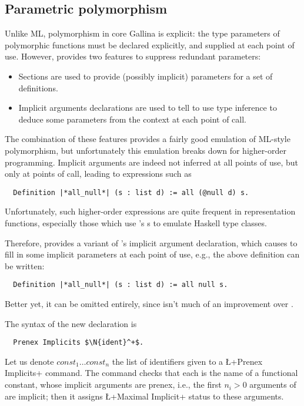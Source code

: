 \subsection{Parametric polymorphism}\label{ssec:parampoly}
Unlike ML, polymorphism in core Gallina is explicit: the type
parameters of polymorphic  functions must be declared explicitly, and
supplied at each point of use. However, \Coq{} provides two features
to suppress redundant parameters:
\begin{itemize}
\item Sections are used to provide (possibly implicit) parameters for
  a set of definitions.
\item Implicit arguments declarations are used to tell \Coq{} to use
  type inference to deduce some parameters from the context at each
  point of call.
\end{itemize}
The combination of these features provides a fairly good emulation of ML-style
polymorphism, but unfortunately this emulation breaks down for
higher-order programming. Implicit arguments are indeed not inferred
at all points of use, but only at
points of call, leading to  expressions such as
\begin{lstlisting}
  Definition |*all_null*| (s : list d) := all (@null d) s.
\end{lstlisting}
Unfortunately, such higher-order expressions are quite frequent in
representation functions, especially those which use \Coq{}'s
s to emulate Haskell type classes.

Therefore, \ssr{} provides a variant of \Coq{}'s implicit argument
declaration, which  causes \Coq{} to fill in some implicit parameters
at each point of use, e.g., the above definition can be written:
\begin{lstlisting}
  Definition |*all_null*| (s : list d) := all null s.
\end{lstlisting}
Better yet, it can be omitted entirely, since  isn't
much of an improvement over .

The syntax of the new declaration is
\begin{lstlisting}
  Prenex Implicits $\N{ident}^+$.
\end{lstlisting}
Let us denote $const_1 \dots const_n$ the list of identifiers given to a
\L+Prenex Implicits+ command.
The command checks that each   is the name of a functional
constant, whose implicit arguments are prenex, i.e., the first $n_i >
0$ arguments of  are implicit; then it assigns
\L+Maximal Implicit+ status to these arguments.

